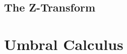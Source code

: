 \subsection{The Z-Transform}



\section{Umbral Calculus}




\begin{comment}


Why don't they teach Newton's calculus of 'What comes next?'
https://www.youtube.com/watch?v=4AuV93LOPcE

Differenzenrechnung: Vom Kalkül der diskreten Analysis
https://www.youtube.com/watch?v=1-Q7Z-F4KVs


\end{comment}